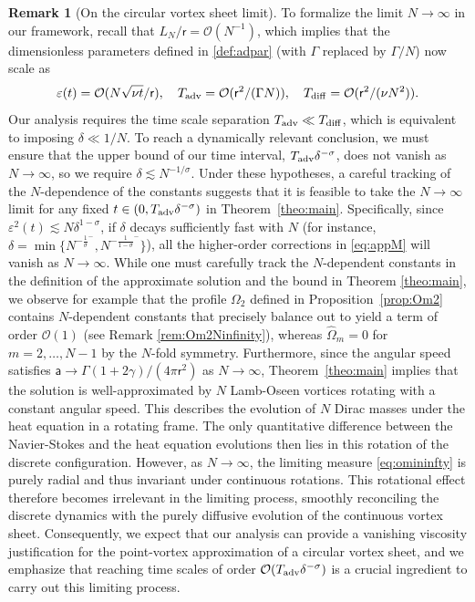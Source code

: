 \documentclass[11pt,reqno,a4paper]{amsart}
\def\eps{\varepsilon}
\newcommand{\cO}{\mathcal{O}}
\newcommand{\1}{\mathbbm{1}}
\theoremstyle{definition}
\newtheorem{remark}[proposition]{Remark}
\theoremstyle{definition}
\numberwithin{equation}{section}
\begin{document}
\begin{remark}[On the circular vortex sheet limit]
To formalize the limit $N\to \infty$ in our framework, recall that $L_N/\mathsf{r} = \cO(N^{-1})$, which implies that the dimensionless parameters defined in \cref{def:adpar} (with $\Gamma$ replaced by $\Gamma/N$)  now scale as \[\eps(t) = \cO(N\sqrt{\nu t}/\mathsf{r}),\quad T_{\rm adv} = \cO(\mathsf{r}^2/(\Gamma N)), \quad T_{\rm diff} = \cO(\mathsf{r}^2/(\nu N^2)).\]
Our analysis requires the time scale separation $T_{\rm adv}\ll T_{\rm diff}$, which is equivalent to imposing $\delta \ll 1/N$. To reach a dynamically relevant conclusion, we must ensure that the upper bound of our time interval, $T_{\rm adv}\delta^{-\sigma}$, does not vanish as $N\to \infty$, so we require $\delta\lesssim N^{-1/\sigma}$. Under these hypotheses, a careful tracking of the $N$-dependence of the constants suggests that it is feasible to take the $N\to \infty$ limit for any fixed $t\in (0,T_{\rm adv}\delta^{-\sigma})$ in Theorem~\ref{theo:main}. 
Specifically, since $\eps^2(t) \lesssim N \delta^{1-\sigma}$, if $\delta$ decays sufficiently fast with $N$ (for instance, $\delta=\min \{N^{-\frac{1}{\sigma}^{-}},N^{-\frac{1}{1-\sigma}^{-}}\}$), all the higher-order corrections in \cref{eq:appM} will vanish as $N\to \infty$. While one must carefully track the $N$-dependent constants in the definition of the approximate solution and the bound in Theorem \ref{theo:main}, we observe for example that the profile $\Omega_{2}$ defined in Proposition~\ref{prop:Om2} contains $N$-dependent constants that precisely balance out to yield a term of order $\cO(1)$ (see Remark \ref{rem:Om2Ninfinity}), whereas $\widehat{\Omega}_m=0$ for $m=2,\dots, N-1$ by the $N$-fold symmetry.
Furthermore, since the angular speed satisfies $\mathsf{a}\to \Gamma(1+2\gamma)/(4\pi \mathsf{r}^2)$ as $N\to \infty$, Theorem~\ref{theo:main} implies that the solution is well-approximated by $N$ Lamb-Oseen vortices rotating with a constant angular speed. This describes the evolution of $N$ Dirac masses under the heat equation in a rotating frame. The only quantitative difference between the Navier-Stokes and the heat equation evolutions then lies in this rotation of the discrete configuration. However, as $N \to \infty$, the limiting measure \cref{eq:omininfty} is purely radial and thus invariant under continuous rotations. This rotational effect therefore becomes irrelevant in the limiting process, smoothly reconciling the discrete dynamics with the purely diffusive evolution of the continuous vortex sheet. 
Consequently, we expect that our analysis can provide a vanishing viscosity justification for the point-vortex approximation of a circular vortex sheet, and we emphasize that reaching time scales of order $\cO(T_{\rm adv}\delta^{-\sigma})$ is a crucial ingredient to carry out this limiting process. 
\end{remark}
\end{document}
